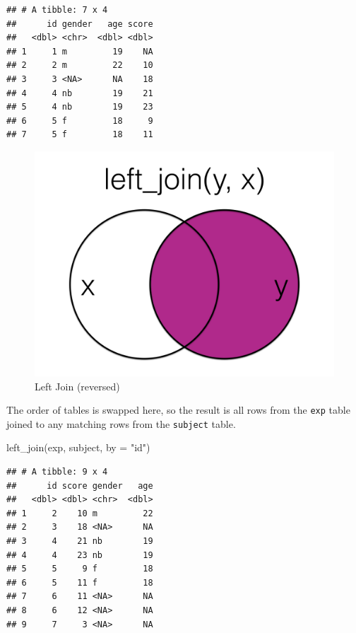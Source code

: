 \documentclass[
  oneside]{book}
\newenvironment{Shaded}{\begin{snugshade}}{\end{snugshade}}
\newcommand{\AttributeTok}[1]{\textcolor[rgb]{0.77,0.63,0.00}{#1}}
\newcommand{\FunctionTok}[1]{\textcolor[rgb]{0.00,0.00,0.00}{#1}}
\newcommand{\NormalTok}[1]{#1}
\newcommand{\StringTok}[1]{\textcolor[rgb]{0.31,0.60,0.02}{#1}}
\begin{document}
\begin{verbatim}
## # A tibble: 7 x 4
##      id gender   age score
##   <dbl> <chr>  <dbl> <dbl>
## 1     1 m         19    NA
## 2     2 m         22    10
## 3     3 <NA>      NA    18
## 4     4 nb        19    21
## 5     4 nb        19    23
## 6     5 f         18     9
## 7     5 f         18    11
\end{verbatim}

\begin{figure}

{\centering \includegraphics[width=1\linewidth]{images/joins/left_join_rev} 

}

\caption{Left Join (reversed)}\label{fig:img-left-join-rev}
\end{figure}

The order of tables is swapped here, so the result is all rows from the \texttt{exp} table joined to any matching rows from the \texttt{subject} table.

\begin{Shaded}
\begin{Highlighting}[]
\FunctionTok{left\_join}\NormalTok{(exp, subject, }\AttributeTok{by =} \StringTok{"id"}\NormalTok{)}
\end{Highlighting}
\end{Shaded}

\begin{verbatim}
## # A tibble: 9 x 4
##      id score gender   age
##   <dbl> <dbl> <chr>  <dbl>
## 1     2    10 m         22
## 2     3    18 <NA>      NA
## 3     4    21 nb        19
## 4     4    23 nb        19
## 5     5     9 f         18
## 6     5    11 f         18
## 7     6    11 <NA>      NA
## 8     6    12 <NA>      NA
## 9     7     3 <NA>      NA
\end{verbatim}
\end{document}
